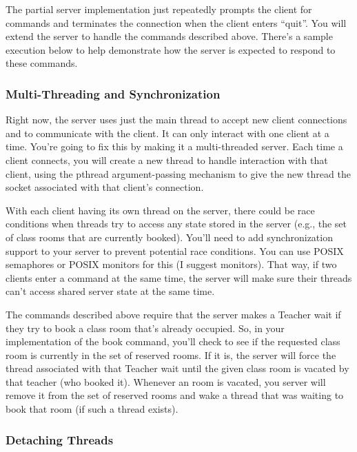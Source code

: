 \documentclass{article}
\begin{document}
\begin{enumerate}
  The partial server implementation just repeatedly prompts the client
  for commands and terminates the connection when the client enters
  ``quit''.  You will extend the server to handle the commands
  described above.  There's a sample execution below to help demonstrate
  how the server is expected to respond to these commands.

\subsubsection*{Multi-Threading and Synchronization}

  Right now, the server uses just the main thread to accept new client
  connections and to communicate with the client.  It can only
  interact with one client at a time.  You're going to fix this by
  making it a multi-threaded server.  Each time a client connects, you
  will create a new thread to handle interaction with that client,
  using the pthread argument-passing mechanism to give the new thread
  the socket associated with that client's connection.

  With each client having its own thread on the server, there could be
  race conditions when threads try to access any state stored in the
  server (e.g., the set of class rooms that are currently booked).  You'll
  need to add synchronization support to your server to prevent
  potential race conditions.  You can use POSIX semaphores or POSIX
  monitors for this (I suggest monitors).  That way, if two clients
  enter a command at the same time, the server will make sure their
  threads can't access shared server state at the same time.

  The commands described above require that the server makes a Teacher
  wait if they try to book a class room that's already occupied.  So,
  in your implementation of the book command, you'll check to see if
  the requested class room is currently in the set of reserved rooms.  If it
  is, the server will force the thread associated with that Teacher wait
  until the given class room is vacated by that teacher (who booked it).  Whenever an room is vacated, you server
  will remove it from the set of reserved rooms and wake a thread that
  was waiting to book that room (if such a thread exists).

\subsubsection*{Detaching Threads}


\end{enumerate}
\end{document}
